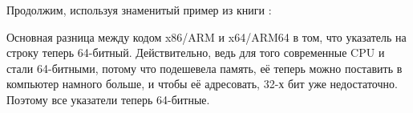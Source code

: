 \chapterold{\HelloWorldSectionName}
\label{sec:helloworld}

Продолжим, используя знаменитый пример из книги \KRBook:














\sectionold{\Conclusion{}}

Основная разница между кодом x86/ARM и x64/ARM64 в том, что указатель на строку теперь 64-битный.
Действительно, ведь для того современные \ac{CPU} и стали 64-битными, потому что подешевела память,
её теперь можно поставить в компьютер намного больше, и чтобы её адресовать, 32-х бит уже
недостаточно.
Поэтому все указатели теперь 64-битные.



